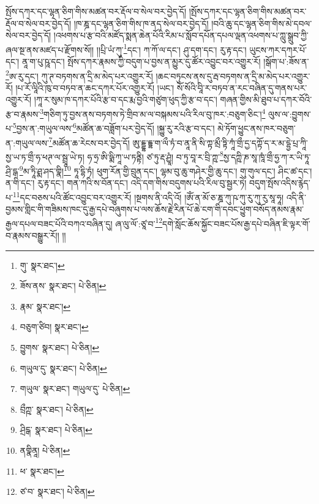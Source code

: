 སྤོས་དཀར་དང་ལྷན་ཅིག་གིས་མཚན་བར་རྡོལ་བ་སེལ་བར་བྱེད་དོ། །སྤོས་དཀར་དང་ལྷན་ཅིག་གིས་མཚན་བར་རྡོལ་བ་སེལ་བར་བྱེད་དོ། །ཁ་ཎྜ་དང་ལྷན་ཅིག་གིས་ཁ་ནད་སེལ་བར་བྱེད་དོ། །བའི་ཆུ་དང་ལྷན་ཅིག་གིས་མེ་དབལ་སེལ་བར་བྱེད་དོ། །འཕགས་པ་རྩ་བའི་མཛོད་སྨན་ཆེན་པོའི་རིམ་པ་སློབ་དཔོན་དཔལ་ལྡན་འཕགས་པ་ཀླུ་སྒྲུབ་ཀྱི་ཞལ་སྔ་ནས་མཛད་པ་རྫོགས་སོ།། །།པྲི་ཡཾ་ཀུ་\footnote{གུ་  སྣར་ཐང་། }དང་། ཀ་ཀོ་ལ་དང་། ཤུ་དག་དང་། རུ་རྟ་དང་། ཡུངས་ཀར་དཀར་པོ་དང་། ནཱ་ག་པུ་ཥཱ་དང་། སྤོས་དཀར་རྣམས་ཀྱི་བདུག་པ་བྱས་ན་མྱུར་དུ་ཚོར་འབྱུང་བར་འགྱུར་རོ། །སྒོག་པ་:ཟོས་ན་\footnote{ཟོས་ནས་  སྣར་ཐང་།  པེ་ཅིན། }ཨ་རུ་དང་། ཀུ་ཊ་བཏགས་ན་དྲི་མ་མེད་པར་འགྱུར་རོ། །ཆང་བཏུངས་ནས་དུ་རྦ་བཏགས་ན་དྲི་མ་མེད་པར་འགྱུར་རོ། །པ་རོ་ལཱིའི་ཁུ་བ་བཏབ་ན་ཆང་དཀར་པོར་འགྱུར་རོ། །ཡང་། སོ་སོའི་བཱི་ར་བཏབ་ན་རང་བཞིན་དུ་གནས་པར་འགྱུར་རོ། །ཀཱ་ར་སུམ་ཁ་དཀར་པོའི་རྩ་བ་དང་རྨ་བྱའི་གཙུག་ཕུད་ཀྱི་རྩ་བ་དང་། གཞན་གྱིས་མི་ཐུབ་པ་དཀར་བོའི་རྩ་བ་རྣམས་\footnote{རྣམ་  སྣར་ཐང་། }གཅིག་ཏུ་བྱས་ནས་བཏགས་ཏེ་གྲིབ་མ་ལ་བསྐམས་པའི་རིལ་བུ་ཁར་:བཅུག་ཅིང་།\footnote{བཅུག་ཙིབ།  སྣར་ཐང་། } ལུས་ལ་:བྱུགས་པ་\footnote{བྱུགས་  སྣར་ཐང་།  པེ་ཅིན། }བྱས་ན་:གཡུལ་ལས་\footnote{གཡུལ་དུ་  སྣར་ཐང་།  པེ་ཅིན། }མཚོན་ཆ་བཟློག་པར་བྱེད་དོ། །སྐྱུ་རུ་རའི་རྩ་བ་དང་། མེ་ཏོག་ཕྱུང་ནས་ཁར་བཅུག་ན་:གཡུལ་ལས་\footnote{གཡུལ་  སྣར་ཐང་། གཡུལ་དུ་  པེ་ཅིན། }མཚོན་ཆ་རེངས་བར་བྱེད་དོ། ཨུ་ངྡྷ་དྟྷ་ག་ལྀ་ཏཾ་བ་ནཱ་ནི་སི་ཀྟ་མྲྀ་ཏྟི་ཀཱཾ་གྲྀ་དྱ་དཀྟོ་ད་ར་མ་དྷྱེ་པྲ་ཀཱི་སྱ་ཡ་ཏ་གྲྀ་ཧ་ཕཊ་ལ་སྦྲཱ་ཡེ་ཏ། ཧ་ཧྲ་ཨི་ཥྨི་ཀཱ་ཡ་ཏནྟི། ཙ་ཏུ་རྡ་ཤྱཱཾ། བ་ཏུ་བཱ་ར་བྲི་ཀྵ་\footnote{བྲྀཀྵ་  སྣར་ཐང་།  པེ་ཅིན། }སྱ་དཀྵི་ཎ་སཱ་ཁཱཾ་གྲྀ་ཧྱ་ཀ་ར་ཡི་ཏཱ་ཤྲི་དྒ་\footnote{ཤྲིངྒ་  སྣར་ཐང་།  པེ་ཅིན། }མ་ཏཱི་ཤྨ་ཤད་གྣི།\footnote{ནགྣིནཱ།  པེ་ཅིན། } ཏཱ་དྷི་ཏཾ། ཕུག་རོན་གྱི་བྲུན་དང་། ལྷམ་བུ་ཆུ་གཤེར་གྱི་ཆུ་དང་། གུ་གུལ་དང་། ཤིང་ཚ་དང་། ན་གི་དང་། རུ་རྟ་དང་། གན་ཀའི་ས་བོན་དང་། འདི་དག་གིས་བདུགས་པའི་རིལ་བུ་སྦྱར་ཏེ། བདུག་སྤོས་འདིས་རྙེད་པ་\footnote{ཕ་  སྣར་ཐང་། }དང་བཅས་པའི་ཚོང་འབྱུང་བར་འགྱུར་རོ། །སྔགས་ནི་འདི་འོ། །ཨོཾ་ན་མོ་ཅ་ཎྜ་ཀུ་ཥ་ཀུ་རུ་ཀུ་རུ་སཱ་ཧཱ། འདི་ནི་བྱམས་གླིང་གི་གཟིམས་ཁང་དུ་རྒྱ་དཔེ་བཞུགས་པ་ལས་ཆོས་རྗེ་རིན་པོ་ཆེ་ངག་གི་དབང་ཕྱུག་བསོད་ནམས་རྣམ་རྒྱལ་དཔལ་བཟང་པོའི་བཀའ་བཞིན་དུ། ཞ་ལུ་ལོ་:ཙཱ་བ་\footnote{ཙ་བ་  སྣར་ཐང་།  པེ་ཅིན། }དགེ་སློང་ཆོས་སྐྱོང་བཟང་པོས་རྒྱ་དཔེ་བཞིན་ཇི་ལྟར་གོ་བ་རྣམས་བསྒྱུར་རོ།། །།